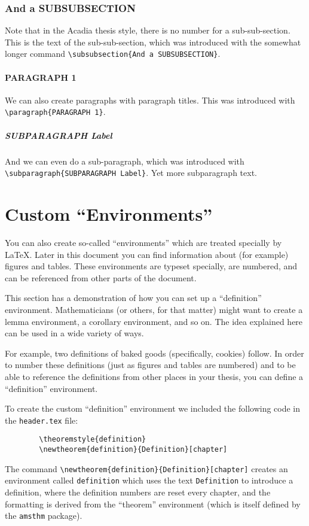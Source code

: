 \subsubsection{And a SUBSUBSECTION}
\label{sec:THREE}
Note that in the Acadia thesis style, there is no number for a
sub-sub-section.  This is the text of the sub-sub-section, which was
introduced with the somewhat longer command
\verb|\subsubsection{And a SUBSUBSECTION}|.
\paragraph{PARAGRAPH 1}
\label{sec:FOUR}
We can also create paragraphs with paragraph titles.  This was
introduced with \verb|\paragraph{PARAGRAPH 1}|.
\subparagraph{SUBPARAGRAPH Label}
And we can even do a sub-paragraph, which was introduced with
\verb|\subparagraph{SUBPARAGRAPH Label}|. 
\label{sec:FIVE}
Yet more subparagraph text.

\section{Custom ``Environments''}
\label{sec:CUSTOMSEC}
You can also create so-called ``environments'' which are treated
specially by \LaTeX.  Later in this document you can find information
about (for example) figures and tables.  These environments are
typeset specially, are numbered, and can be referenced from other
parts of the document.

This section has a demonstration of how you can set up a
``definition'' environment.  Mathematicians (or others, for that
matter) might want to create a lemma environment, a corollary
environment, and so on.  The idea explained here can be used in a wide
variety of ways.

For example, two definitions of baked goods (specifically, cookies)
follow.  In order to number these definitions (just as figures and
tables are numbered) and to be able to reference the definitions from
other places in your thesis, you can define a ``definition''
environment.

To create the custom ``definition'' environment we included the 
following code in the \verb|header.tex| file:
\begin{verbatim}
        \theoremstyle{definition}
        \newtheorem{definition}{Definition}[chapter]
\end{verbatim}
\noindent
The command \verb|\newtheorem{definition}{Definition}[chapter]|
creates an environment called \verb|definition| which
uses the text \verb|Definition| to introduce a definition, where the
definition numbers are reset every chapter, and the formatting is
derived from the ``theorem'' environment (which is itself defined by the
\verb|amsthm| package).

